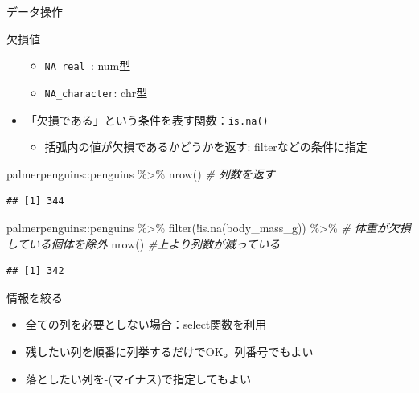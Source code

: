 \documentclass[
  ignorenonframetext,
]{beamer}
\newenvironment{Shaded}{\begin{snugshade}}{\end{snugshade}}
\newcommand{\CommentTok}[1]{\textcolor[rgb]{0.56,0.35,0.01}{\textit{#1}}}
\newcommand{\FunctionTok}[1]{\textcolor[rgb]{0.00,0.00,0.00}{#1}}
\newcommand{\NormalTok}[1]{#1}
\newcommand{\SpecialCharTok}[1]{\textcolor[rgb]{0.00,0.00,0.00}{#1}}
\providecommand{\tightlist}{%
  \setlength{\itemsep}{0pt}\setlength{\parskip}{0pt}}
\begin{document}
\begin{frame}[fragile]{データ操作}
\begin{block}{欠損値}
\begin{itemize}
  \begin{itemize}
  \tightlist
  \item
    \texttt{NA\_real\_}: num型
  \item
    \texttt{NA\_character}: chr型
  \end{itemize}
\item
  「欠損である」という条件を表す関数：\texttt{is.na()}

  \begin{itemize}
  \tightlist
  \item
    括弧内の値が欠損であるかどうかを返す: filterなどの条件に指定
  \end{itemize}
\end{itemize}

\begin{Shaded}
\begin{Highlighting}[]
\NormalTok{palmerpenguins}\SpecialCharTok{::}\NormalTok{penguins }\SpecialCharTok{\%\textgreater{}\%} \FunctionTok{nrow}\NormalTok{() }\CommentTok{\# 列数を返す}
\end{Highlighting}
\end{Shaded}

\begin{verbatim}
## [1] 344
\end{verbatim}

\begin{Shaded}
\begin{Highlighting}[]
\NormalTok{palmerpenguins}\SpecialCharTok{::}\NormalTok{penguins }\SpecialCharTok{\%\textgreater{}\%}
  \FunctionTok{filter}\NormalTok{(}\SpecialCharTok{!}\FunctionTok{is.na}\NormalTok{(body\_mass\_g)) }\SpecialCharTok{\%\textgreater{}\%} \CommentTok{\# 体重が欠損している個体を除外}
  \FunctionTok{nrow}\NormalTok{() }\CommentTok{\#上より列数が減っている}
\end{Highlighting}
\end{Shaded}

\begin{verbatim}
## [1] 342
\end{verbatim}
\end{block}

\begin{block}{情報を絞る}
\protect\hypertarget{ux60c5ux5831ux3092ux7d5eux308b}{}
\begin{itemize}
\tightlist
\item
  全ての列を必要としない場合：select関数を利用
\item
  残したい列を順番に列挙するだけでOK。列番号でもよい
\item
  落としたい列を-(マイナス)で指定してもよい
\end{itemize}


\end{block}
\end{frame}
\end{document}

